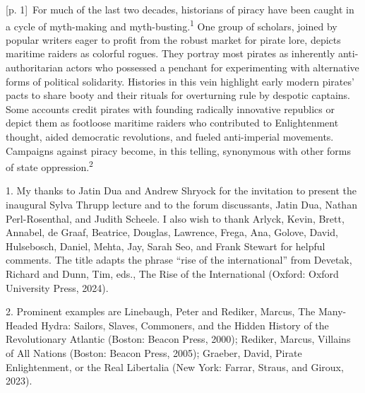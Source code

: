 \documentclass[10pt,a4paper]{article}
\begin{document}
{\scriptsize\color{gray} [p. 1]}\ For much of the last two decades, historians of piracy have been caught in a cycle of myth-making and myth-busting.\nobreak\textsuperscript{1} One group of scholars, joined by popular writers eager to profit from the robust market for pirate lore, depicts maritime raiders as colorful rogues. They portray most pirates as inherently anti-authoritarian actors who possessed a penchant for experimenting with alternative forms of political solidarity. Histories in this vein highlight early modern pirates’ pacts to share booty and their rituals for overturning rule by despotic captains. Some accounts credit pirates with founding radically innovative republics or depict them as footloose maritime raiders who contributed to Enlightenment thought, aided democratic revolutions, and fueled anti-imperial movements. Campaigns against piracy become, in this telling, synonymous with other forms of state oppression.\nobreak\textsuperscript{2}\par{\small 1. My thanks to Jatin Dua and Andrew Shryock for the invitation to present the inaugural Sylva Thrupp lecture and to the forum discussants, Jatin Dua, Nathan Perl-Rosenthal, and Judith Scheele. I also wish to thank Arlyck, Kevin, Brett, Annabel, de Graaf, Beatrice, Douglas, Lawrence, Frega, Ana, Golove, David, Hulsebosch, Daniel, Mehta, Jay, Sarah Seo, and Frank Stewart for helpful comments. The title adapts the phrase “rise of the international” from Devetak, Richard and Dunn, Tim, eds., The Rise of the International (Oxford: Oxford University Press, 2024).\par}{\small 2. Prominent examples are Linebaugh, Peter and Rediker, Marcus, The Many-Headed Hydra: Sailors, Slaves, Commoners, and the Hidden History of the Revolutionary Atlantic (Boston: Beacon Press, 2000); Rediker, Marcus, Villains of All Nations (Boston: Beacon Press, 2005); Graeber, David, Pirate Enlightenment, or the Real Libertalia (New York: Farrar, Straus, and Giroux, 2023).\par}
\end{document}
